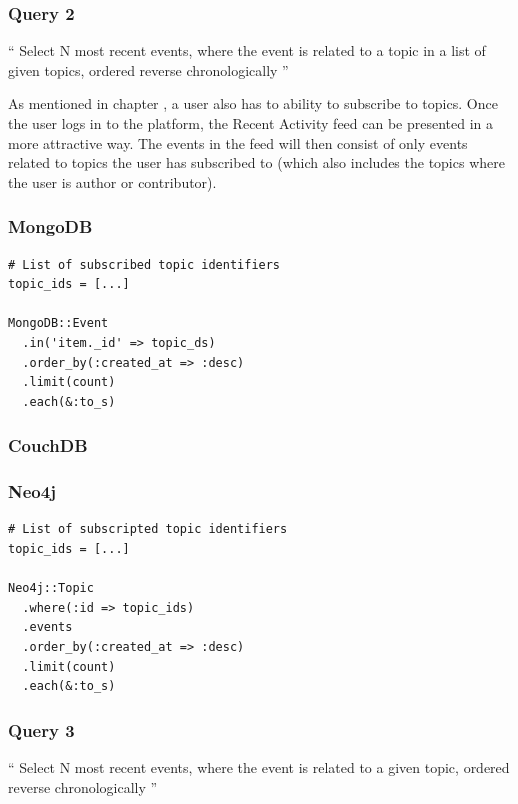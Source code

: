 \subsubsection{Query 2}
\label{subsubsec:query-2}

``
Select N most recent events, where the event is related to a topic in a list of given topics, ordered reverse chronologically
''

As mentioned in chapter , a user also has to ability to subscribe to topics.
Once the user logs in to the platform, the Recent Activity feed can be presented in a more attractive way.
The events in the feed will then consist of only events related to topics the user has subscribed to (which also includes the topics where the user is author or contributor).

\subsubsection*{MongoDB}

\begin{verbatim}
# List of subscribed topic identifiers
topic_ids = [...]

MongoDB::Event
  .in('item._id' => topic_ds)
  .order_by(:created_at => :desc)
  .limit(count)
  .each(&:to_s)
\end{verbatim}

\subsubsection*{CouchDB}


\subsubsection*{Neo4j}

\begin{verbatim}
# List of subscripted topic identifiers
topic_ids = [...]

Neo4j::Topic
  .where(:id => topic_ids)
  .events
  .order_by(:created_at => :desc)
  .limit(count)
  .each(&:to_s)
\end{verbatim}

\subsubsection{Query 3}
\label{subsubsec:query-3}

``
Select N most recent events, where the event is related to a given topic, ordered reverse chronologically
''

